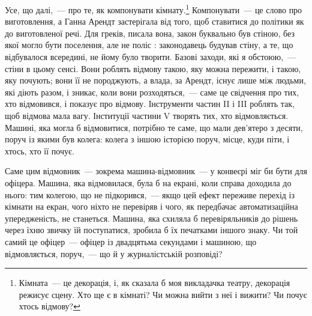 Усе, що далі,~— про те, як компонувати кімнату.\footnote{Кімната~— це декорація, і, як сказала б моя викладачка театру, декорація режисує сцену. Хто ще є в кімнаті? Чи можна вийти з неї і вижити? Чи почує хтось відмову?} Компонувати~— це слово про виготовлення, а Ганна Арендт застерігала від того, щоб ставитися до політики як до виготовленої речі. Для греків, писала вона, закон буквально був стіною, без якої могло бути поселення, але не поліс \autocite{arendt1958human}: законодавець будував стіну, а те, що відбувалося всередині, не йому було творити. Базові заходи, які я обстоюю,~— стіни в цьому сенсі. Вони роблять відмову такою, яку можна пережити, і такою, яку почують; вони її не породжують, а влада, за Арендт, існує лише між людьми, які діють разом, і зникає, коли вони розходяться,~— саме це свідчення про тих, хто відмовився, і показує про відмову. Інструменти частин II і III роблять так, щоб відмова мала вагу. Інституції частини V творять тих, хто відмовляється. Машині, яка могла б відмовитися, потрібно те саме, що мали дев’ятеро з десяти, поруч із якими був колега: колега з іншою історією поруч, місце, куди піти, і хтось, хто її почує.

Саме цим відмовник~— зокрема машина-відмовник~— у конвеєрі міг би бути для офіцера. Машина, яка відмовилася, була б на екрані, коли справа доходила до нього: тим колегою, що не підкорився,~— якщо цей ефект переживе перехід із кімнати на екран, чого ніхто не перевіряв і чого, як передбачає автоматизаційна упередженість, не станеться. Машина, яка схиляла б перевіряльників до рішень через їхню звичку їй поступатися, зробила б їх печатками іншого знаку. Чи той самий це офіцер~— офіцер із двадцятьма секундами і машиною, що відмовляється, поруч,~— що й у журналістській розповіді?
